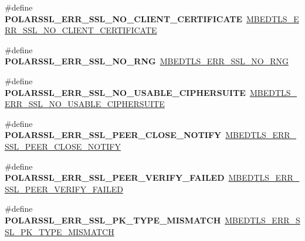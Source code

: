 \begin{DoxyCompactItemize}
\item 
\mbox{\label{compat-1_83_8h_aeb836450c3b6ffa966cf6cf74ffe927f}} 
\#define {\bfseries P\+O\+L\+A\+R\+S\+S\+L\+\_\+\+E\+R\+R\+\_\+\+S\+S\+L\+\_\+\+N\+O\+\_\+\+C\+L\+I\+E\+N\+T\+\_\+\+C\+E\+R\+T\+I\+F\+I\+C\+A\+TE}~\mbox{\hyperlink{ssl_8h_aaa160d753b94b4ecf6e22a1415450e8f}{M\+B\+E\+D\+T\+L\+S\+\_\+\+E\+R\+R\+\_\+\+S\+S\+L\+\_\+\+N\+O\+\_\+\+C\+L\+I\+E\+N\+T\+\_\+\+C\+E\+R\+T\+I\+F\+I\+C\+A\+TE}}
\item 
\mbox{\label{compat-1_83_8h_a19cbe729aeb55df7d04669cb98a38fe0}} 
\#define {\bfseries P\+O\+L\+A\+R\+S\+S\+L\+\_\+\+E\+R\+R\+\_\+\+S\+S\+L\+\_\+\+N\+O\+\_\+\+R\+NG}~\mbox{\hyperlink{ssl_8h_aebfdb35dab3c9928c1db296b7b7140ab}{M\+B\+E\+D\+T\+L\+S\+\_\+\+E\+R\+R\+\_\+\+S\+S\+L\+\_\+\+N\+O\+\_\+\+R\+NG}}
\item 
\mbox{\label{compat-1_83_8h_a7ca4fcdd5ec6418f0af9b8d67b12f847}} 
\#define {\bfseries P\+O\+L\+A\+R\+S\+S\+L\+\_\+\+E\+R\+R\+\_\+\+S\+S\+L\+\_\+\+N\+O\+\_\+\+U\+S\+A\+B\+L\+E\+\_\+\+C\+I\+P\+H\+E\+R\+S\+U\+I\+TE}~\mbox{\hyperlink{ssl_8h_a50fc11595bf8ff0c2a39afe627623aae}{M\+B\+E\+D\+T\+L\+S\+\_\+\+E\+R\+R\+\_\+\+S\+S\+L\+\_\+\+N\+O\+\_\+\+U\+S\+A\+B\+L\+E\+\_\+\+C\+I\+P\+H\+E\+R\+S\+U\+I\+TE}}
\item 
\mbox{\label{compat-1_83_8h_a8e4c3b27c9e170358c71c83683c554da}} 
\#define {\bfseries P\+O\+L\+A\+R\+S\+S\+L\+\_\+\+E\+R\+R\+\_\+\+S\+S\+L\+\_\+\+P\+E\+E\+R\+\_\+\+C\+L\+O\+S\+E\+\_\+\+N\+O\+T\+I\+FY}~\mbox{\hyperlink{ssl_8h_ac5e16e4c94a7e4ba0cf6b95c4547ddb1}{M\+B\+E\+D\+T\+L\+S\+\_\+\+E\+R\+R\+\_\+\+S\+S\+L\+\_\+\+P\+E\+E\+R\+\_\+\+C\+L\+O\+S\+E\+\_\+\+N\+O\+T\+I\+FY}}
\item 
\mbox{\label{compat-1_83_8h_ab8af28117b65fb455f8bc95b7f8a1f8a}} 
\#define {\bfseries P\+O\+L\+A\+R\+S\+S\+L\+\_\+\+E\+R\+R\+\_\+\+S\+S\+L\+\_\+\+P\+E\+E\+R\+\_\+\+V\+E\+R\+I\+F\+Y\+\_\+\+F\+A\+I\+L\+ED}~\mbox{\hyperlink{ssl_8h_ac53adea4d4086a8e344459b053a5717b}{M\+B\+E\+D\+T\+L\+S\+\_\+\+E\+R\+R\+\_\+\+S\+S\+L\+\_\+\+P\+E\+E\+R\+\_\+\+V\+E\+R\+I\+F\+Y\+\_\+\+F\+A\+I\+L\+ED}}
\item 
\mbox{\label{compat-1_83_8h_a3bcdd01778f66202a4e9d9a16ac7e271}} 
\#define {\bfseries P\+O\+L\+A\+R\+S\+S\+L\+\_\+\+E\+R\+R\+\_\+\+S\+S\+L\+\_\+\+P\+K\+\_\+\+T\+Y\+P\+E\+\_\+\+M\+I\+S\+M\+A\+T\+CH}~\mbox{\hyperlink{ssl_8h_acfee5259b88126fa1f8fc5437a089f57}{M\+B\+E\+D\+T\+L\+S\+\_\+\+E\+R\+R\+\_\+\+S\+S\+L\+\_\+\+P\+K\+\_\+\+T\+Y\+P\+E\+\_\+\+M\+I\+S\+M\+A\+T\+CH}}

\end{DoxyCompactItemize}
